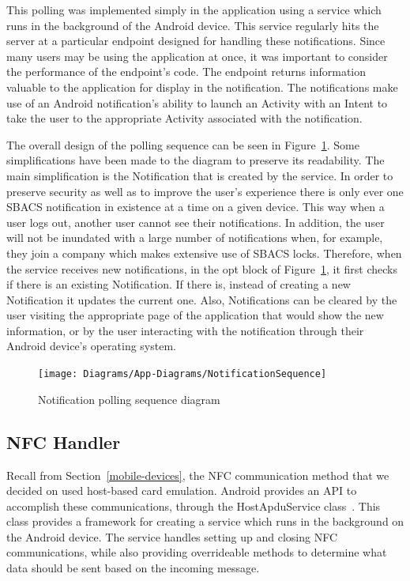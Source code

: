 \documentclass[12pt]{report}
\let\Oldsubsection\subsection
\renewcommand{\subsection}{\FloatBarrier\Oldsubsection}
\begin{document}
This polling was implemented simply in the application using a service which runs in the background of the Android
device. This service regularly hits the server at a particular endpoint designed for handling these notifications. Since
many users may be using the application at once, it was important to consider the performance of the endpoint's code.
The endpoint returns information valuable to the application for display in the notification. The notifications make use
of an Android notification's ability to launch an Activity with an Intent to take the user to the appropriate Activity
associated with the notification.

The overall design of the polling sequence can be seen in Figure~\ref{fig:notfication-sequence}. Some simplifications
have been made to the diagram to preserve its readability. The main simplification is the Notification that is created
by the service. In order to preserve security as well as to improve the user's experience there is only ever one SBACS
notification in existence at a time on a given device. This way when a user logs out, another user cannot see their
notifications. In addition, the user will not be inundated with a large number of notifications when, for example, they
join a company which makes extensive use of SBACS locks. Therefore, when the service receives new notifications, in the
opt block of Figure~\ref{fig:notfication-sequence}, it first checks if there is an existing Notification. If there is,
instead of creating a new Notification it updates the current one. Also, Notifications can be cleared by the user
visiting the appropriate page of the application that would show the new information, or by the user interacting with
the notification through their Android device's operating system.

\begin{figure}
    \centering
    \texttt{[image: Diagrams/App-Diagrams/NotificationSequence]}
    \caption{Notification polling sequence diagram}
    \label{fig:notfication-sequence}
\end{figure}


\subsection{NFC Handler} \label{nfc-handler}

Recall from Section~\ref{mobile-devices}, the NFC communication method that we decided on used host-based card emulation. Android provides
an API to accomplish these communications, through the HostApduService class~\autocite{ANDROIDAPDU}. This class provides a framework for
creating a service which runs in the background on the Android device. The service handles setting up and closing NFC
communications, while also providing overrideable methods to determine what data should be sent based on the incoming
message.
\end{document}
